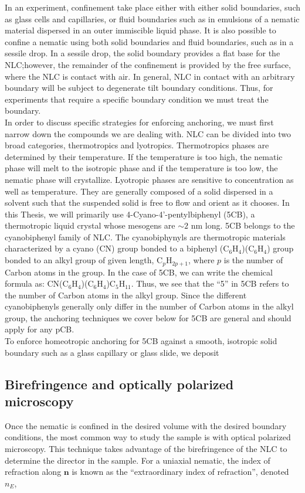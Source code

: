 In an experiment, confinement take place either with either solid boundaries, such as glass cells and capillaries, or fluid boundaries such as in emulsions of a nematic material dispersed in an outer immiscible liquid phase.
It is also possible to confine a nematic using both solid boundaries and fluid boundaries, such as in a sessile drop.
In a sessile drop, the solid boundary provides a flat base for the NLC;\@ however, the remainder of the confinement is provided by the free surface, where the NLC is contact with air.
In general, NLC in contact with an arbitrary boundary will be subject to degenerate tilt boundary conditions.
Thus, for experiments that require a specific boundary condition we must treat the boundary.\\

In order to discuss specific strategies for enforcing anchoring, we must first narrow down the compounds we are dealing with.
NLC can be divided into two broad categories, thermotropics and lyotropics.
Thermotropics phases are determined by their temperature.
If the temperature is too high, the nematic phase will melt to the isotropic phase and if the temperature is too low, the nematic phase will crystallize.
Lyotropic phases are sensitive to concentration as well as temperature.
They are generally composed of a solid dispersed in a solvent such that the suspended solid is free to flow and orient as it chooses.
In this Thesis, we will primarily use 4-Cyano-4'-pentylbiphenyl (5CB), a thermotropic liquid crystal whose mesogens are $\sim 2$ nm long.\@
5CB belongs to the cyanobiphenyl family of NLC.
The cyanobiphynyls are thermotropic materials characterized by a cyano (CN) group  bonded to a biphenyl (C$_6$H$_4$)(C$_6$H$_4$) group bonded to an alkyl group of given length, C$_p$H$_{2p+1}$, where $p$ is the number of Carbon atoms in the group.
In the case of 5CB, we can write the chemical formula as: CN(C$_6$H$_4$)(C$_6$H$_4$)C$_5$H$_{11}$.
Thus, we see that the ``5'' in 5CB refers to the number of Carbon atoms in the alkyl group.
Since the different cyanobiphenyls generally only differ in the number of Carbon atoms in the alkyl group, the anchoring techniques we cover below for 5CB are general and should apply for any pCB. \\

To enforce homeotropic anchoring for 5CB against a smooth, isotropic solid boundary such as a glass capillary or glass slide, we deposit




\subsection{Birefringence and optically polarized microscopy}
Once the nematic is confined in the desired volume with the desired boundary conditions, the most common way to study the sample is with optical polarized microscopy.
This technique takes advantage of the birefringence of the NLC to determine the director in the sample.
For a uniaxial nematic, the index of refraction along $\mathbf{n}$ is known as the ``extraordinary index of refraction'', denoted $n_E$,

